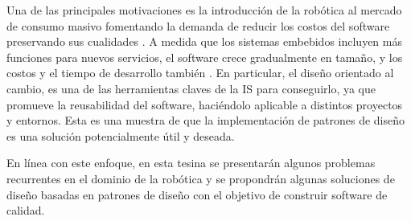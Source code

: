 Una de las principales motivaciones es la introducción de la robótica al mercado de consumo masivo fomentando la demanda de reducir los costos del software preservando sus cualidades \cite{Brugali2009}. A medida que los sistemas embebidos incluyen más funciones para nuevos servicios, el software crece gradualmente en tamaño, y los costos y el tiempo de desarrollo también \cite{model2}. En particular, el diseño orientado al cambio, es una de las herramientas claves de la \gls{IS} para conseguirlo, ya que promueve la reusabilidad del software, haciéndolo aplicable a distintos proyectos y entornos. Esta es una muestra de que la implementación de patrones de diseño es una solución potencialmente útil y deseada.

En línea con este enfoque, en esta tesina se presentarán algunos problemas recurrentes en el dominio de la robótica y se propondrán algunas soluciones de diseño basadas en patrones de diseño con el objetivo de construir software de calidad.

